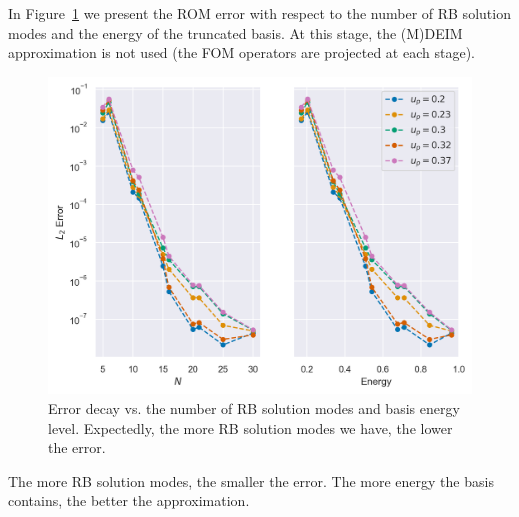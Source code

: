 \documentclass[../../thesis.tex]{subfiles}
\begin{document}
In Figure~\ref{fig:error_decay} we present the ROM error with respect to 
the number of RB solution modes and the energy of the truncated basis. 
At this stage, the (M)DEIM approximation is not used
(the FOM operators are projected at each stage).
\begin{figure}[h]
    \centering
    \includegraphics[width=\columnwidth]{research_project/piston/figures/rb_certification/error_decay.png}
    \caption{Error decay vs. the number of RB solution modes and basis energy level.
    Expectedly, the more RB solution modes we have, the lower the error.}
    \label{fig:error_decay}
\end{figure}
The more RB solution modes, the smaller the error.
The more energy the basis contains, the better the approximation.
\end{document}
